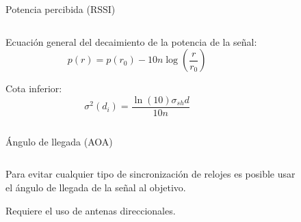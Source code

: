 \documentclass{beamer}
\begin{document}
    \begin{frame}{Potencia percibida (RSSI)}
      \begin{columns}
        \begin{column}{0.5\textwidth}
          Ecuación general del decaimiento de la potencia de la señal:
          \begin{equation*}\label{eq:RSSI}
            p(r) = p(r_0) - 10n\log(\frac{r}{r_0})
          \end{equation*}

          Cota inferior:
          \begin{equation*}\label{eq:CRLB_RSSI}
            \sigma^2(d_i) = \frac{\ln(10)\sigma_{sh}d}{10n}
        \end{equation*}
        \end{column}
        \begin{column}{0.5\textwidth}  
          \begin{figure}[H]
            \centering
            \def\svgwidth{\linewidth}
            
            \label{fig:TOA}
        \end{figure}
        \end{column}
        \end{columns}
    \end{frame}

    \begin{frame}{Ángulo de llegada (AOA)}
      \begin{columns}
        \begin{column}{0.5\textwidth}
          Para evitar cualquier tipo de sincronización de relojes es posible usar el ángulo de llegada de la señal al objetivo.

          \vspace{0.5cm}
          Requiere el uso de antenas direccionales.
        \end{column}
        \begin{column}{0.5\textwidth}  
          \begin{figure}[H]
            \centering
            \def\svgwidth{\linewidth}
            
            \label{fig:AOA}
        \end{figure}
        \end{column}
        \end{columns}
      \end{frame}
\end{document}
